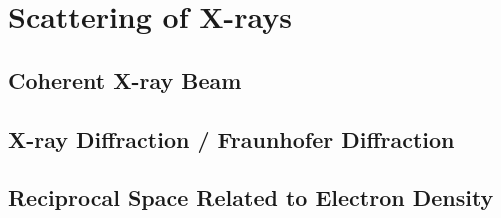 \chapter{Scattering of X-rays}

\section{Coherent X-ray Beam}

\section{X-ray Diffraction / Fraunhofer Diffraction} %

\section{Reciprocal Space Related to Electron Density}